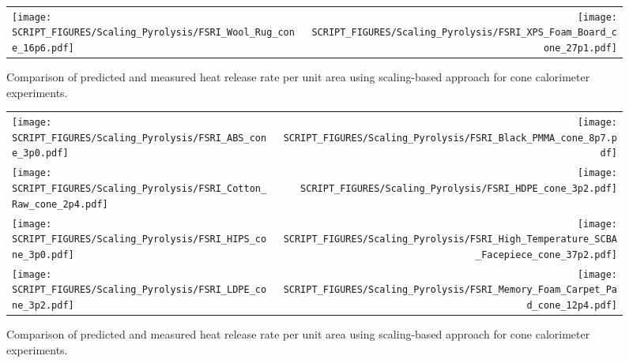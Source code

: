 \begin{figure}[p]
\begin{tabular*}{\textwidth}{l@{\extracolsep{\fill}}r}
\texttt{[image: SCRIPT\_FIGURES/Scaling\_Pyrolysis/FSRI\_Wool\_Rug\_cone\_16p6.pdf]} &
\texttt{[image: SCRIPT\_FIGURES/Scaling\_Pyrolysis/FSRI\_XPS\_Foam\_Board\_cone\_27p1.pdf]} \\
\end{tabular*}
\caption[HRRPUA of FSRI Materials using scaling model , Others materials]
{Comparison of predicted and measured heat release rate per unit area using scaling-based approach for cone calorimeter experiments.}
\label{FSRI_Materials_HRR_Others}
\end{figure}

\begin{figure}[p]
\begin{tabular*}{\textwidth}{l@{\extracolsep{\fill}}r}
\texttt{[image: SCRIPT\_FIGURES/Scaling\_Pyrolysis/FSRI\_ABS\_cone\_3p0.pdf]} &
\texttt{[image: SCRIPT\_FIGURES/Scaling\_Pyrolysis/FSRI\_Black\_PMMA\_cone\_8p7.pdf]} \\
\texttt{[image: SCRIPT\_FIGURES/Scaling\_Pyrolysis/FSRI\_Cotton\_Raw\_cone\_2p4.pdf]} &
\texttt{[image: SCRIPT\_FIGURES/Scaling\_Pyrolysis/FSRI\_HDPE\_cone\_3p2.pdf]} \\
\texttt{[image: SCRIPT\_FIGURES/Scaling\_Pyrolysis/FSRI\_HIPS\_cone\_3p0.pdf]} &
\texttt{[image: SCRIPT\_FIGURES/Scaling\_Pyrolysis/FSRI\_High\_Temperature\_SCBA\_Facepiece\_cone\_37p2.pdf]} \\
\texttt{[image: SCRIPT\_FIGURES/Scaling\_Pyrolysis/FSRI\_LDPE\_cone\_3p2.pdf]} &
\texttt{[image: SCRIPT\_FIGURES/Scaling\_Pyrolysis/FSRI\_Memory\_Foam\_Carpet\_Pad\_cone\_12p4.pdf]} \\
\end{tabular*}
\caption[HRRPUA of FSRI Materials using scaling model , Polymers materials]
{Comparison of predicted and measured heat release rate per unit area using scaling-based approach for cone calorimeter experiments.}
\label{FSRI_Materials_HRR_Polymers}
\end{figure}

